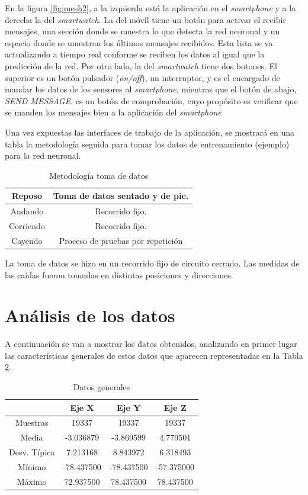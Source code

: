 \documentclass[12pt]{book}
\numberwithin{equation}{section}
\begin{document}
En la figura \ref{fig:mesh2}, a la izquierda está la aplicación en el \textit{smartphone} y a la derecha la del \textit{smartwatch}. La del móvil tiene un botón para activar el recibir mensajes, una sección donde se muestra lo que detecta la red neuronal y un espacio donde se muestran los últimos mensajes recibidos. Esta lista se va actualizando a tiempo real conforme se reciben los datos al igual que la predicción de la red. Por otro lado, la del \textit{smartwatch} tiene dos botones. El superior es un botón pulsador (\textit{on/off}), un interruptor, y es el encargado de mandar los datos de los sensores al \textit{smartphone}, mientras que el botón de abajo, \textit{SEND MESSAGE}, es un botón de comprobación, cuyo propósito es verificar que se manden los mensajes bien a la aplicación del \textit{smartphone}

Una vez expuestas las interfaces de trabajo de la aplicación, se mostrará en una tabla la metodología seguida para tomar los datos de entrenamiento (ejemplo) para la red neuronal.

\begin{table}[h]
\centering
\caption{Metodología toma de datos}
\begin{tabular}{| c | c |}
\hline
Reposo & Toma de datos sentado y de pie. \\
\hline
Andando & Recorrido fijo. \\
\hline
Corriendo & Recorrido fijo. \\
\hline
Cayendo & Proceso de pruebas por repetición \\
\hline
\end{tabular}
\label{tabla1}
\end{table}

La toma de datos se hizo en un recorrido fijo de circuito cerrado. Las medidas de las caídas fueron tomadas en distintas posiciones y direcciones.

\newpage
\section{Análisis de los datos}

A continuación se van a mostrar los datos obtenidos, analizando en primer lugar las características generales de estos datos que aparecen representadas en la Tabla \ref{tabla2}.
\begin{table}[h]
\centering
\caption{Datos generales}
\begin{tabular}{| c | c | c | c |}
\hline
 & Eje X & Eje Y & Eje Z \\
\hline
Muestras & 19337 & 19337 & 19337 \\
\hline
Media & -3.036879 & -3.869599 & 4.779501 \\
\hline
Desv. Típica & 7.213168 & 8.843972 & 6.318493 \\
\hline
Mínimo & -78.437500 & -78.437500 & -57.375000 \\
\hline
Máximo & 72.937500 & 78.437500 & 78.437500 \\
\hline
\end{tabular}
\label{tabla2}
\end{table}
\end{document}
